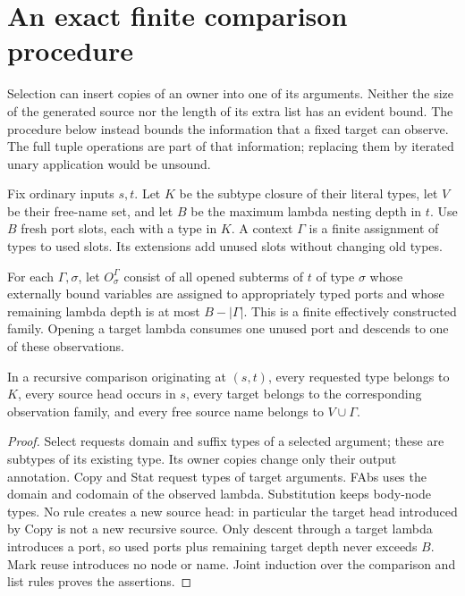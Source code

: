 \section{An exact finite comparison procedure}\label{sec:decision}

Selection can insert copies of an owner into one of its arguments. Neither
the size of the generated source nor the length of its extra list has an
evident bound. The procedure below instead bounds the information that a
fixed target can observe. The full tuple operations are part of that
information; replacing them by iterated unary application would be unsound.

Fix ordinary inputs $s,t$. Let $K$ be the subtype closure of their literal
types, let $V$ be their free-name set, and let $B$ be the maximum lambda
nesting depth in $t$. Use $B$ fresh port slots, each with a type in $K$.
A context $\Gamma$ is a finite assignment of types to used slots. Its
extensions add unused slots without changing old types.

For each $\Gamma,\sigma$, let $O_\sigma^\Gamma$ consist of all opened
subterms of $t$ of type $\sigma$ whose externally bound variables are
assigned to appropriately typed ports and whose remaining lambda depth is
at most $B-|\Gamma|$. This is a finite effectively constructed family.
Opening a target lambda consumes one unused port and descends to one of
these observations.

\begin{lemma}\label{lem:observation-closure}
In a recursive comparison originating at $(s,t)$, every requested type
belongs to $K$, every source head occurs in $s$, every target belongs to
the corresponding observation family, and every free source name belongs
to $V\cup\Gamma$.
\end{lemma}
\begin{proof}
Select requests domain and suffix types of a selected argument; these
are subtypes of its existing type. Its owner copies change only their
output annotation. Copy and Stat request types of target arguments.
FAbs uses the domain and codomain of the observed lambda. Substitution
keeps body-node types. No rule creates a new source head: in particular
the target head introduced by Copy is not a new recursive source.
Only descent through a target lambda introduces a port, so used ports
plus remaining target depth never exceeds $B$. Mark reuse introduces
no node or name. Joint induction over the comparison and list rules
proves the assertions.
\end{proof}

